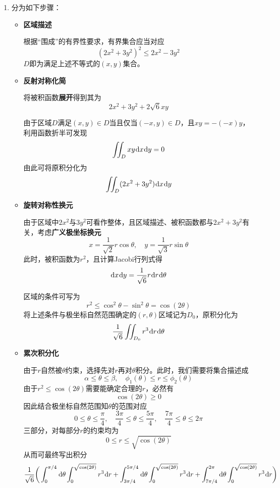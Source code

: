 \documentclass[a4paper,UTF8,fontset=windows,AutoFakeBold]{ctexart}
\newcommand*{\dr}{\hspace{0.07em}\mathrm{d}}
\newcommand*{\extra}{\textbf{附加}}
\newcommand*{\note}{\noindent *}
\theoremstyle{ex}
\begin{document}
\begin{enumerate}
    \note 进一步严谨性分析(\extra)：由于在$x=0$处$y=\sqrt{x}$不可导，上述解的定义域$(0,+\infty)$已经是初值问题解的最大存在区间。

    \item 分为如下步骤：
    \begin{itemize}
        \item \textbf{区域描述}
            
        根据``围成''的有界性要求，有界集合应当对应
        $$(2x^2+3y^2)^2\le 2x^2-3y^2$$
        $D$即为满足上述不等式的$(x,y)$集合。

        \item \textbf{反射对称化简}
        
        将被积函数\textbf{展开}得到其为
        $$2x^2+3y^2+2\sqrt{6}xy$$
            
        由于区域$D$满足$(x,y)\in D$当且仅当$(-x,y)\in D$，且$xy=-(-x)y$，利用函数折半可发现
        $$\iint_Dxy\dr x\dr y=0$$
        由此可将原积分化为
        $$\iint_D(2x^2+3y^2)\dr x\dr y$$
            
        \item \textbf{旋转对称性换元}
            
        由于区域中$2x^2$与$3y^2$可看作整体，且区域描述、被积函数都与$2x^2+3y^2$有关，考虑\textbf{广义极坐标换元}
        $$x=\frac{1}{\sqrt2}r\cos\theta,\quad y=\frac{1}{\sqrt3}r\sin\theta$$
        此时，被积函数为$r^2$，且计算Jacobi行列式得
        $$\dr x\dr y=\frac{1}{\sqrt6}r\dr r\dr\theta$$

        区域的条件可写为
        $$r^2\le\cos^2\theta-\sin^2\theta=\cos(2\theta)$$
        将上述条件与极坐标自然范围确定的$(r,\theta)$区域记为$D_0$，原积分化为
        $$\frac{1}{\sqrt6}\iint_{D_0}r^3\dr r\dr\theta$$

        \item \textbf{累次积分化}
            
        由于$r$自然被$\theta$约束，选择先对$r$再对$\theta$积分。此时，我们需要将集合描述成
        $$\alpha\le\theta\le\beta,\quad\phi_1(\theta)\le r\le\phi_2(\theta)$$
        由于$r^2\le\cos(2\theta)$需要能确定合理的$r$，必然有
        $$\cos(2\theta)\ge0$$
        因此结合极坐标自然范围知$\theta$的范围对应
        $$0\le\theta\le\frac{\pi}{4},\quad\frac{3\pi}{4}\le\theta\le\frac{5\pi}{4},\quad\frac{7\pi}{4}\le\theta\le2\pi$$
        三部分，对每部分$r$的约束均为
        $$0\le r\le\sqrt{\cos(2\theta)}$$
        从而可最终写出积分
        $$\frac{1}{\sqrt6}\bigg(\int_0^{\pi/4}\dr\theta\int_0^{\sqrt{\cos(2\theta)}}r^3\dr r+\int_{3\pi/4}^{5\pi/4}\dr\theta\int_0^{\sqrt{\cos(2\theta)}}r^3\dr r+\int_{7\pi/4}^{2\pi}\dr\theta\int_0^{\sqrt{\cos(2\theta)}}r^3\dr r\bigg)$$


\end{itemize}
\end{enumerate}
\end{document}
